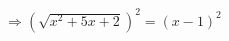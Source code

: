 \documentclass[preview]{standalone}
\begin{document}
\begin{align*}
\Rightarrow \left(\sqrt{x^2 + 5x + 2}\right)^2 = (x - 1)^2
\end{align*}
\end{document}
